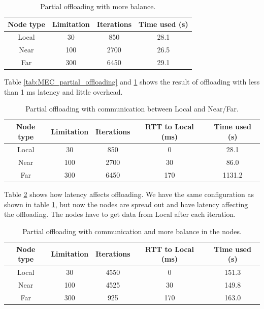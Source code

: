 \begin{table}[h!]
    \centering
    \begin{tabular}[c]{|c|c|c|c|}
        \hline
        Node type & Limitation & Iterations & Time used (s)\\
        \hline
        \hline
        Local & 30 & 850 & 28.1 \\
        \hline
        Near & 100 & 2700 & 26.5 \\
        \hline
        Far & 300 & 6450 & 29.1 \\
        \hline
    \end{tabular}
    \caption{Partial offloading with more balance.}
    \label{tab:MEC_partial_offloading_balanced}
\end{table}
Table \ref{tab:MEC_partial_offloading} and \ref{tab:MEC_partial_offloading_balanced} shows the result of offloading with less than 1 ms latency and little overhead.






\begin{table}[h!]
    \centering
    \begin{tabular}[c]{|c|c|c|c|c|}
        \hline
        Node type & Limitation & Iterations & RTT to Local (ms)& Time used (s)\\
        \hline
        \hline
        Local & 30 & 850 & 0 & 28.1 \\
        \hline
        Near & 100 & 2700 & 30 & 86.0 \\
        \hline
        Far & 300 & 6450 & 170 & 1131.2 \\
        \hline
    \end{tabular}
    \caption{Partial offloading with communication between Local and Near/Far.}
    \label{tab:MEC_partial_offloading_latency}
\end{table}

Table \ref{tab:MEC_partial_offloading_latency} shows how latency affects offloading. We have the same configuration as shown in table \ref{tab:MEC_partial_offloading_balanced}, but now the nodes are spread out and have latency affecting the offloading. The nodes have to get data from Local after each iteration.

\begin{table}[h!]
    \centering
    \begin{tabular}[c]{|c|c|c|c|c|}
        \hline
        Node type & Limitation & Iterations & RTT to Local (ms)& Time used (s)\\
        \hline
        \hline
        Local & 30 & 4550 & 0 & 151.3  \\
        \hline
        Near & 100 & 4525 & 30 & 149.8 \\
        \hline
        Far & 300 & 925 & 170 & 163.0 \\
        \hline
    \end{tabular}
    \caption{Partial offloading with communication and more balance in the nodes.}
    \label{tab:MEC_partial_offloading_latency_balance}
\end{table}


